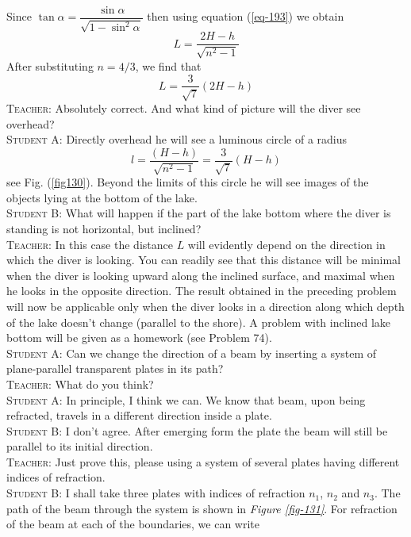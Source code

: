 \documentclass[a4paper,sfsidenotes]{tufte-book}
\begin{document}
 Since $\tan \alpha = \dfrac{\sin \alpha}{ \sqrt{1 - \sin^{2} \alpha}}$ then using equation (\ref{eq-193}) we obtain
\begin{equation}
L = \frac{2H - h}{\sqrt{n^{2}-1}}
\label{eq-194}
\end{equation}
After substituting $n=4/3$, we find that
\begin{equation*}
L = \frac{3}{\sqrt{7}}(2H -h)
\end{equation*}
\textsc{Teacher:} Absolutely correct. And what kind of picture will the diver see overhead?
\\
\textsc{Student A:} Directly overhead he will see a luminous circle of a radius 
\begin{equation*}
l = \frac{(H-h)}{\sqrt{n^{2}-1}} = \frac{3}{\sqrt{7}} (H-h)
\end{equation*}
see Fig. (\ref{fig130}). Beyond the limits of this circle he will see images of the objects lying at the bottom of the lake.
\\
\textsc{Student B:} What will happen if the part of the lake bottom where the diver is standing is not horizontal, but inclined?
\\
\textsc{Teacher:} In this case the distance $L$ will evidently depend on the direction in which the diver is looking. You can readily see that this distance will be minimal when the diver is looking upward along the inclined surface, and maximal when he looks in the opposite direction. The result obtained in the preceding problem will now be applicable only when the diver looks in a direction along which depth of the lake doesn't change (parallel to the shore). A problem with inclined lake bottom will be given as a homework (see Problem 74).
\\
\textsc{Student A:} Can we change the direction of a beam by inserting a system of plane-parallel transparent plates in its path?
\\
\textsc{Teacher:} What do you think?
\\
\textsc{Student A:} In principle, I think we can. We know that beam, upon being refracted, travels in a different direction inside a plate. 
\\
\textsc{Student B:} I don't agree. After emerging form the plate the beam will still be parallel to its initial direction.
\\
\textsc{Teacher:} Just prove this, please using a system of several plates having different indices of refraction.
\\
\textsc{Student B:} I shall take three plates with indices of refraction $n_{1}$, $n_{2}$ and $n_{3}$. The path of the beam through the system is shown in \emph{Figure \ref{fig-131}}. For refraction of the beam at each of the boundaries, we can write
\end{document}
